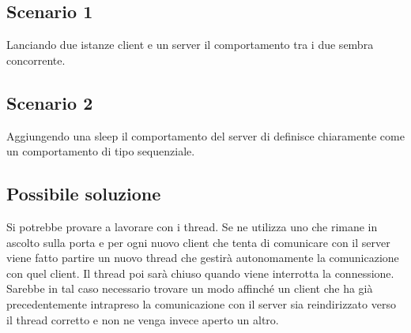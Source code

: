 \documentclass[a4paper]{article}
\begin{document}
\subsection{Scenario 1}
Lanciando due istanze client e un server il comportamento tra i due sembra concorrente.
\subsection{Scenario 2}
Aggiungendo una sleep il comportamento del server di definisce chiaramente come un comportamento di tipo 
sequenziale.
\subsection{Possibile soluzione}
Si potrebbe provare a lavorare con i thread. Se ne utilizza uno che rimane in ascolto sulla porta e per ogni nuovo client che tenta di comunicare con il server viene fatto partire un nuovo thread che gestirà autonomamente la comunicazione con quel client. Il thread poi sarà chiuso quando viene interrotta la connessione. Sarebbe in tal caso necessario trovare un modo affinché un client che ha già precedentemente intrapreso la comunicazione con il server sia reindirizzato verso il thread corretto e non ne venga invece aperto un altro.
\end{document}
